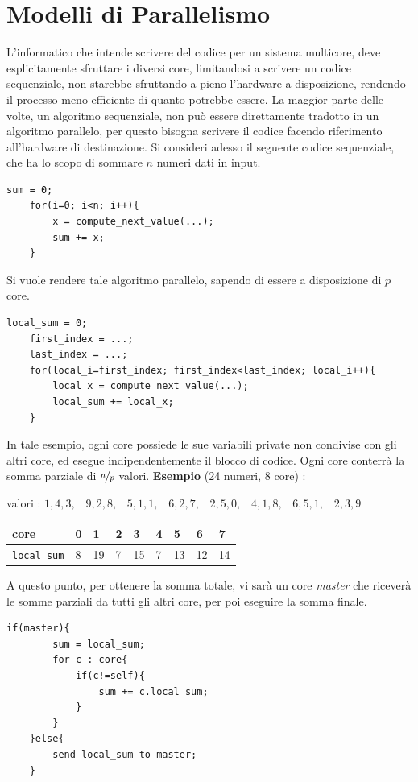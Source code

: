 \documentclass[10pt, letterpaper]{report}
\begin{document}
\section{Modelli di Parallelismo}
L'informatico che intende scrivere del codice per un sistema multicore, deve esplicitamente 
sfruttare i diversi core, limitandosi a scrivere un codice sequenziale, non starebbe sfruttando a pieno 
l'hardware a disposizione, rendendo il processo meno efficiente di quanto potrebbe essere.\acc 
La maggior parte delle volte, un algoritmo sequenziale, non può essere direttamente tradotto in un 
algoritmo parallelo, per questo bisogna scrivere il codice facendo riferimento all'hardware di 
destinazione. Si consideri adesso il seguente codice sequenziale, che ha lo scopo di sommare 
$n$ numeri dati in input.
\begin{lstlisting}[style=CStyle]
    sum = 0;
    for(i=0; i<n; i++){
        x = compute_next_value(...);
        sum += x;
    }
\end{lstlisting}
Si vuole rendere tale algoritmo parallelo, sapendo di essere a disposizione di $p$ core.
\begin{lstlisting}[style=CStyle]
    local_sum = 0;
    first_index = ...;
    last_index = ...;
    for(local_i=first_index; first_index<last_index; local_i++){
        local_x = compute_next_value(...);
        local_sum += local_x;
    }
\end{lstlisting}
In tale esempio, ogni core possiede le sue variabili private non condivise con gli altri core, 
ed esegue indipendentemente il blocco di codice. Ogni core conterrà la somma
parziale di $\nicefrac{n}{p}$ valori.\acc 
\textbf{Esempio} (24 numeri, 8 core) :\begin{center}
    valori : $1,4,3,\;\;\;9,2,8,\;\;\;5,1,1,\;\;\;6,2,7,\;\;\;2,5,0,\;\;\;4,1,8,\;\;\;6,5,1,\;\;\;2,3,9$\acc 
    \begin{tabular}{|l|l|l|l|l|l|l|l|l|}
        \hline
        \rowcolor[HTML]{C0C0C0} 
        core & 0 & 1 & 2 & 3 & 4 & 5 & 6 & 7 \\ \hline
        \texttt{local\_sum}    & 8 & 19 & 7 & 15 & 7 & 13 & 12 & 14 \\ \hline
        \end{tabular}
\end{center}
A questo punto, per ottenere la somma totale, vi sarà un core \textit{master} che riceverà le somme 
parziali da tutti gli altri core, per poi eseguire la somma finale.
\begin{lstlisting}[style=CStyle]
    if(master){
        sum = local_sum;
        for c : core{
            if(c!=self){
                sum += c.local_sum;
            }
        }
    }else{
        send local_sum to master;
    }
\end{lstlisting}
\end{document}
